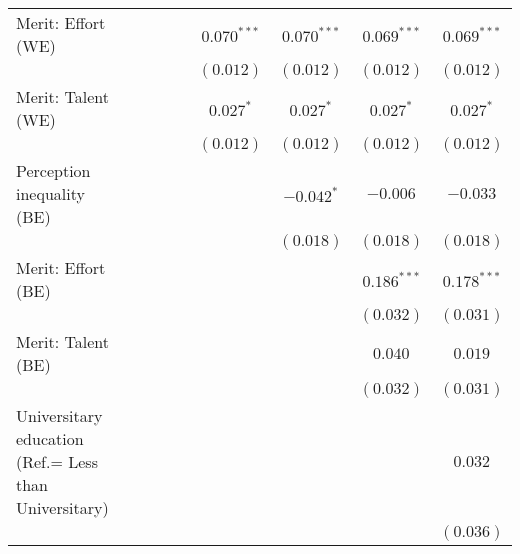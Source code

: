 \documentclass[
  12pt,
]{article}
\begin{document}
\begin{table}
\begin{center}
{\begin{tabular}{l c c c c c c c c}
Merit: Effort (WE)                                    &               &                &                &                & $0.070^{***}$  & $0.070^{***}$  & $0.069^{***}$  & $0.069^{***}$  \\
                                                      &               &                &                &                & $(0.012)$      & $(0.012)$      & $(0.012)$      & $(0.012)$      \\
Merit: Talent (WE)                                    &               &                &                &                & $0.027^{*}$    & $0.027^{*}$    & $0.027^{*}$    & $0.027^{*}$    \\
                                                      &               &                &                &                & $(0.012)$      & $(0.012)$      & $(0.012)$      & $(0.012)$      \\
Perception inequality (BE)                            &               &                &                &                &                & $-0.042^{*}$   & $-0.006$       & $-0.033$       \\
                                                      &               &                &                &                &                & $(0.018)$      & $(0.018)$      & $(0.018)$      \\
Merit: Effort (BE)                                    &               &                &                &                &                &                & $0.186^{***}$  & $0.178^{***}$  \\
                                                      &               &                &                &                &                &                & $(0.032)$      & $(0.031)$      \\
Merit: Talent (BE)                                    &               &                &                &                &                &                & $0.040$        & $0.019$        \\
                                                      &               &                &                &                &                &                & $(0.032)$      & $(0.031)$      \\
Universitary education (Ref.= Less than Universitary) &               &                &                &                &                &                &                & $0.032$        \\
                                                      &               &                &                &                &                &                &                & $(0.036)$      \\

\end{tabular}}
\end{center}
\end{table}
\end{document}
